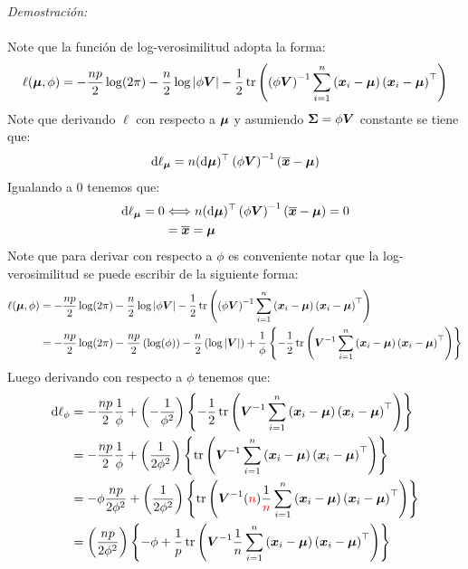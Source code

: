 \emph{Demostración:}\\
\\
Note que la función de log-verosimilitud adopta la forma:
$$
\ell(\bf{\mu},\phi) = -\frac{np}{2}\log(2\pi)-\frac{n}{2} \log |\phi \bf{V}|-\frac{1}{2} \operatorname{tr}\left( \parcurvo{\phi \bf{V}}^{-1}\suma \parcurvo{
\bf{x}_i - \bf{\mu}
}\parcurvo{
\bf{x}_i - \bf{\mu}
}^\top\right)
$$
Note que derivando $\ell$ con respecto a $\bf{\mu}$ y asumiendo $\bf{\Sigma} = \phi \bf{V}$ constante se tiene que:
\begin{align*}
\de \ell _{\bf{\mu}} = n (\de \bf{\mu})^\top
    \parcurvo{\phi \bf{V}}^{-1} \parcurvo{
\bf{\barra{x}} - \bf{\mu}
}
\end{align*}
Igualando a 0 tenemos que:
\begin{align*}
\de \ell_{\bf{\mu}} = 0 &\ssi n (\de \bf{\mu})^\top
    \parcurvo{\phi \bf{V}}^{-1} \parcurvo{
\bf{\barra{x}} - \bf{\mu}
} = 0\\
&= \barra{\bf{x}} = \bf{\mu}
\end{align*}
Note que para derivar con respecto a $\phi$ es conveniente notar que la log-verosimilitud se puede escribir de la siguiente forma:
\begin{align*}
\ell(\bf{\mu},\phi) &= -\frac{np}{2}\log(2\pi)-\frac{n}{2} \log |\phi \bf{V}|-\frac{1}{2} \operatorname{tr}\left( \parcurvo{\phi \bf{V}}^{-1}\suma \parcurvo{
\bf{x}_i - \bf{\mu}
}\parcurvo{
\bf{x}_i - \bf{\mu}
}^\top\right)\\
&= -\frac{np}{2}\log(2\pi) -\frac{np}{2} \parcurvo{\log( \phi)} -\frac{n}{2}\parcurvo{\log|\bf{V}|} +\dfrac{1}{\phi}\parllave{-\dfrac{1}{2}\tr\parcurvo{ \bf{V}^{-1}\suma \parcurvo{
\bf{x}_i - \bf{\mu}
}\parcurvo{
\bf{x}_i - \bf{\mu}
}^\top}}
\end{align*}
Luego derivando con respecto a $\phi$ tenemos que:
\begin{align*}
\de \ell_{\phi} &= -\dfrac{np}{2} \dfrac{1}{\phi} + \parcurvo{-\dfrac{1}{\phi^2}}\parllave{-\dfrac{1}{2}\tr\parcurvo{ \bf{V}^{-1}\suma \parcurvo{
\bf{x}_i - \bf{\mu}
}\parcurvo{
\bf{x}_i - \bf{\mu}
}^\top}}\\
&=
-\dfrac{np}{2} \dfrac{1}{\phi} + \parcurvo{\dfrac{1}{2\phi^2}}\parllave{\tr\parcurvo{ \bf{V}^{-1}\suma \parcurvo{
\bf{x}_i - \bf{\mu}
}\parcurvo{
\bf{x}_i - \bf{\mu}
}^\top}}\\
&=
-\phi\dfrac{np}{2\phi^2} + \parcurvo{\dfrac{1}{2\phi^2}}\parllave{\tr\parcurvo{ \bf{V}^{-1}(\textcolor{red}{n})\dfrac{1}{\textcolor{red}{n}}\suma \parcurvo{
\bf{x}_i - \bf{\mu}
}\parcurvo{
\bf{x}_i - \bf{\mu}
}^\top}}\\
&= \parcurvo{\dfrac{np}{2\phi^2}}\parllave{ -\phi + \dfrac{1}{p}\tr\parcurvo{ \bf{V}^{-1}\dfrac{1}{n}\suma \parcurvo{
\bf{x}_i - \bf{\mu}
}\parcurvo{
\bf{x}_i - \bf{\mu}
}^\top}}
\end{align*}
